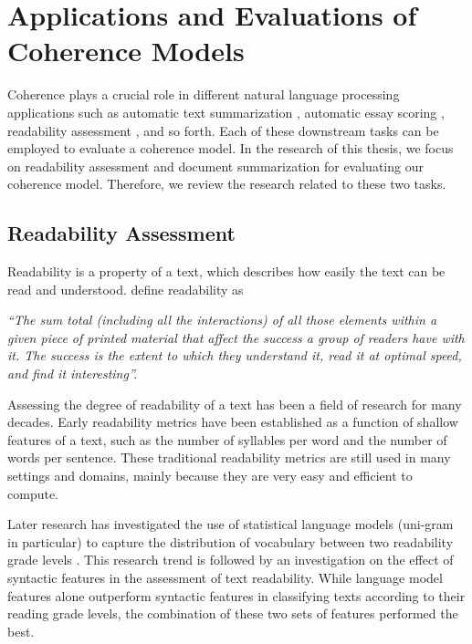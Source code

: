 \section{Applications and Evaluations of Coherence Models}
\label{sec:rel-coh-applications}

Coherence plays a crucial role in different natural language processing applications such as automatic text summarization \cite{celikyilmaz11,linzhiheng12,fengvanessawei12a}, automatic essay scoring \cite{miltsakaki04a,higgins04,burstein10}, readability assessment \cite{pitler08,wangxinhao13}, and so forth.  
Each of these downstream tasks can be employed to evaluate a coherence model. 
In the research of this thesis, we focus on readability assessment and document summarization for evaluating our coherence model. 
Therefore, we review the research related to these two tasks. 


\subsection{Readability Assessment}

Readability is a property of a text, which describes how easily the text can be read and understood.  
 define readability as 

\emph{``The sum total (including all the interactions) of all those elements within a given piece of printed material that affect the success a group of readers have with it. 
The success is the extent to which they understand it, read it at optimal speed, and find it interesting''.}

Assessing the degree of readability of a text has been a field of research for many decades. 
Early readability metrics \cite{flesch48,kincaid75} have been established as a function of shallow features of a text, such as the number of syllables per word and the number of words per sentence. 
These traditional readability metrics are still used in many settings and domains, mainly because they are very easy and efficient to compute.  

Later research has investigated the use of statistical language models 
(uni-gram in particular) to capture the distribution of vocabulary between two readability grade levels
\cite{siluo01,collins-thompson04}. 
This research trend is followed by an investigation on the effect of syntactic features \cite{schwarm05,heilman07,petersen09} in the assessment of text readability. 
While language model features alone outperform syntactic features in classifying texts according to their reading grade levels, the combination of these two sets of features performed the best. 

